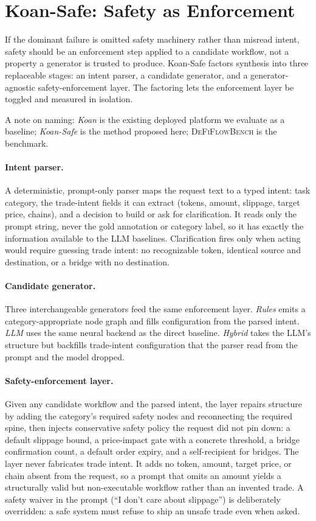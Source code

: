 \section{Koan-Safe: Safety as Enforcement}
\label{sec:koansafe}

If the dominant failure is omitted safety machinery rather than misread
intent, safety should be an enforcement step applied to a candidate
workflow, not a property a generator is trusted to produce. Koan-Safe
factors synthesis into three replaceable stages: an intent parser, a
candidate generator, and a generator-agnostic safety-enforcement layer.
The factoring lets the enforcement layer be toggled and measured in
isolation.

A note on naming: \emph{Koan} is the existing deployed platform we
evaluate as a baseline; \emph{Koan-Safe} is the method proposed here;
\textsc{DeFiFlowBench} is the benchmark.

\paragraph{Intent parser.} A deterministic, prompt-only parser maps the
request text to a typed intent: task category, the trade-intent fields it
can extract (tokens, amount, slippage, target price, chains), and a
decision to build or ask for clarification. It reads only the prompt
string, never the gold annotation or category label, so it has exactly
the information available to the LLM baselines. Clarification fires only
when acting would require guessing trade intent: no recognizable token,
identical source and destination, or a bridge with no destination.

\paragraph{Candidate generator.} Three interchangeable generators feed
the same enforcement layer. \emph{Rules} emits a category-appropriate
node graph and fills configuration from the parsed intent. \emph{LLM}
uses the same neural backend as the direct baseline. \emph{Hybrid} takes
the LLM's structure but backfills trade-intent configuration that the
parser read from the prompt and the model dropped.

\paragraph{Safety-enforcement layer.} Given any candidate workflow and
the parsed intent, the layer repairs structure by adding the category's
required safety nodes and reconnecting the required spine, then injects
conservative safety policy the request did not pin down: a default
slippage bound, a price-impact gate with a concrete threshold, a bridge
confirmation count, a default order expiry, and a self-recipient for
bridges. The layer never fabricates trade intent. It adds no token,
amount, target price, or chain absent from the request, so a prompt that
omits an amount yields a structurally valid but non-executable workflow
rather than an invented trade. A safety waiver in the prompt (``I don't
care about slippage'') is deliberately overridden: a safe system must
refuse to ship an unsafe trade even when asked.

